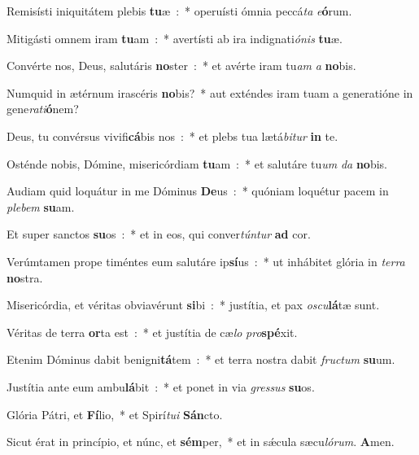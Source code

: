 \item Remisísti iniquitátem plebis \textbf{tu}æ~:~* operuísti ómnia peccá\emph{ta} \emph{e}\textbf{ó}rum.
\item Mitigásti omnem iram \textbf{tu}am~:~* avertísti ab ira indignati\emph{ó}\emph{nis} \textbf{tu}æ.
\item Convérte nos, Deus, salutáris \textbf{no}ster~:~* et avérte iram tu\emph{am} \emph{a} \textbf{no}bis.
\item Numquid in ætérnum irascéris \textbf{no}bis?~* aut exténdes iram tuam a generatióne in gene\emph{ra}\emph{ti}\textbf{ó}nem?
\item Deus, tu convérsus vivifi\textbf{cá}bis nos~:~* et plebs tua lætá\emph{bi}\emph{tur} \textbf{in} te.
\item Osténde nobis, Dómine, misericórdiam \textbf{tu}am~:~* et salutáre tu\emph{um} \emph{da} \textbf{no}bis.
\item Audiam quid loquátur in me Dóminus \textbf{De}us~:~* quóniam loquétur pacem in \emph{ple}\emph{bem} \textbf{su}am.
\item Et super sanctos \textbf{su}os~:~* et in eos, qui conver\emph{tún}\emph{tur} \textbf{ad} cor.
\item Verúmtamen prope timéntes eum salutáre ip\textbf{sí}us~:~* ut inhábitet glória in \emph{ter}\emph{ra} \textbf{no}stra.
\item Misericórdia, et véritas obviavérunt \textbf{si}bi~:~* justítia, et pax \emph{o}\emph{scu}\textbf{lá}tæ sunt.
\item Véritas de terra \textbf{or}ta est~:~* et justítia de cæ\emph{lo} \emph{pro}\textbf{spé}xit.
\item Etenim Dóminus dabit benigni\textbf{tá}tem~:~* et terra nostra dabit \emph{fru}\emph{ctum} \textbf{su}um.
\item Justítia ante eum ambu\textbf{lá}bit~:~* et ponet in via \emph{gres}\emph{sus} \textbf{su}os.
\item Glória Pátri, et \textbf{Fí}lio,~* et Spirí\emph{tu}\emph{i} \textbf{Sán}cto.
\item Sicut érat in princípio, et núnc, et \textbf{sém}per,~* et in sǽcula sæcu\emph{ló}\emph{rum}. \textbf{A}men.